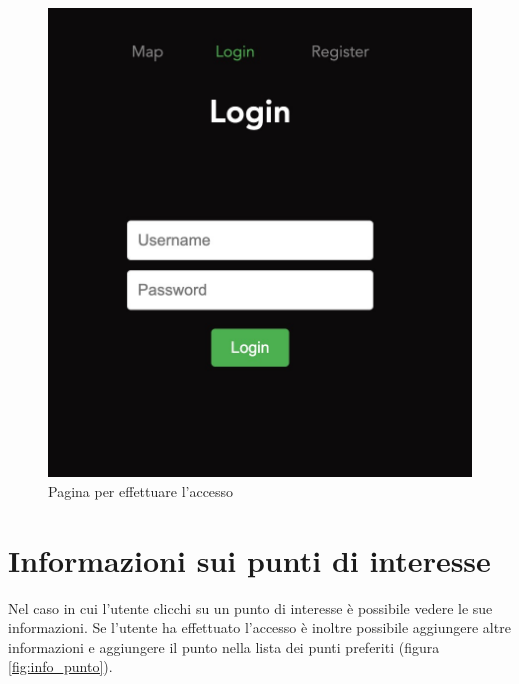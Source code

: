 \begin{figure}[h]
    \begin{minipage}{0.40\textwidth}
        \includegraphics[width=\textwidth]{images/Login.jpg}
        \caption[Pagina per effettuare l'accesso]{Pagina per effettuare l'accesso}
        \label{fig:login}
    \end{minipage}
\end{figure}

\section{Informazioni sui punti di interesse}
Nel caso in cui l'utente clicchi su un punto di interesse è possibile vedere le sue informazioni. Se l'utente ha effettuato l'accesso è inoltre possibile aggiungere altre informazioni e aggiungere il punto nella lista dei punti preferiti (figura \ref{fig:info_punto}).

